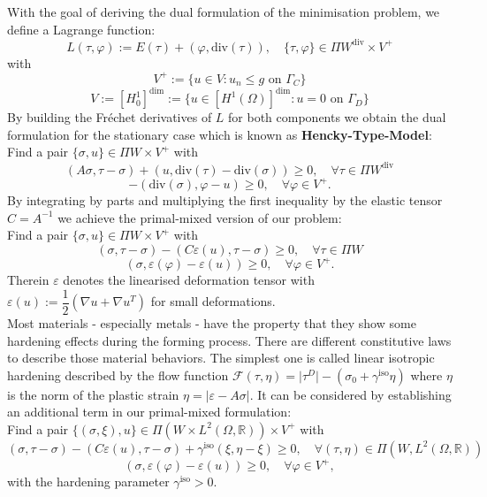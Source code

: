\documentclass{article}
\begin{document}
With the goal of deriving the dual formulation of the minimisation
problem, we define a Lagrange function:
$$L(\tau,\varphi) := E(\tau) + (\varphi, \textrm{div}(\tau)),\quad \lbrace\tau,\varphi\rbrace\in\Pi W^{\textrm{div}}\times V^+$$
with
$$V^+ := \lbrace u\in V: u_n\leq g \text{ on } \Gamma_C \rbrace$$
$$V:=\left[ H_0^1 \right]^{\textrm{dim}}:=\lbrace u\in \left[H^1(\Omega)\right]^{\textrm{dim}}: u
= 0 \text{ on } \Gamma_D\rbrace$$
By building the Fr\'echet derivatives of $L$ for both components we obtain the
dual formulation for the stationary case which is known as \textbf{Hencky-Type-Model}:\\
Find a pair $\lbrace\sigma,u\rbrace\in \Pi W\times V^+$ with
$$\left(A\sigma,\tau - \sigma\right) + \left(u, \textrm{div}(\tau) - \textrm{div}(\sigma)\right) \geq 0,\quad \forall \tau\in \Pi W^{\textrm{div}}$$
$$-\left(\textrm{div}(\sigma),\varphi - u\right) \geq 0,\quad \forall \varphi\in V^+.$$
By integrating by parts and multiplying the first inequality by the elastic
tensor $C=A^{-1}$ we achieve the primal-mixed version of our problem:\\
Find a pair $\lbrace\sigma,u\rbrace\in \Pi W\times V^+$ with
$$\left(\sigma,\tau - \sigma\right) - \left(C\varepsilon(u), \tau - \sigma\right) \geq 0,\quad \forall \tau\in \Pi W$$
$$\left(\sigma,\varepsilon(\varphi) - \varepsilon(u)\right) \geq 0,\quad \forall \varphi\in V^+.$$
Therein $\varepsilon$ denotes the linearised deformation tensor with $\varepsilon(u) := \dfrac{1}{2}\left(\nabla u + \nabla u^T\right)$ for small deformations.\\
Most materials - especially metals - have the property that they show some hardening effects during the forming process.
There are different constitutive laws to describe those material behaviors. The
simplest one is called linear isotropic hardening described by the flow function
$\mathcal{F}(\tau,\eta) = \vert\tau^D\vert - (\sigma_0 + \gamma^{\text{iso}}\eta)$ where
$\eta$ is the norm of the plastic strain $\eta = \vert \varepsilon -
A\sigma\vert$.
It can be considered by establishing an additional term in our primal-mixed formulation:\\
Find a pair $\lbrace(\sigma,\xi),u\rbrace\in \Pi (W\times L^2(\Omega,\mathbb{R}))\times V^+$ with
$$\left(\sigma,\tau - \sigma\right) - \left(C\varepsilon(u), \tau - \sigma\right) + \gamma^{\text{iso}}\left( \xi, \eta - \xi\right) \geq 0,\quad \forall (\tau,\eta)\in \Pi (W,L^2(\Omega,\mathbb{R}))$$
$$\left(\sigma,\varepsilon(\varphi) - \varepsilon(u)\right) \geq 0,\quad \forall \varphi\in V^+,$$
with the hardening parameter $\gamma^{\text{iso}} > 0$.\\
\end{document}
